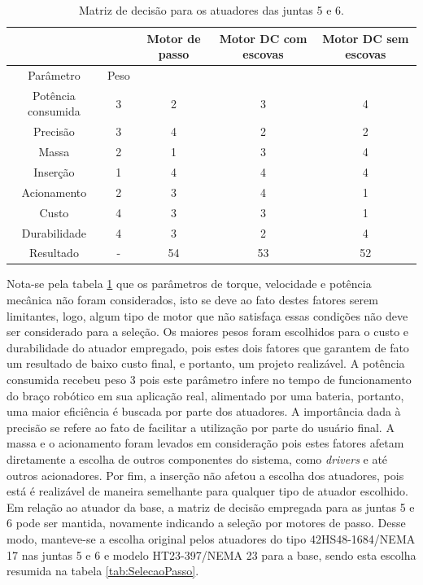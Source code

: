 \begin{table}[h]
\begin{centering}    
    
\begin{tabular}{|c|c|c|c|c|}
    \hline
     & & Motor de passo & Motor DC com escovas & Motor DC sem escovas \tabularnewline
    \hline
    Parâmetro & Peso & & & \tabularnewline 
    \hline
    \hline
    Potência consumida & 3 & 2 & 3 & 4 \tabularnewline
    \hline
    Precisão & 3 & 4 & 2 & 2 \tabularnewline
    \hline
    Massa & 2 & 1 & 3 & 4 \tabularnewline
    \hline
    Inserção & 1 & 4 & 4 & 4 \tabularnewline
    \hline    
    Acionamento & 2 & 3 & 4 & 1 \tabularnewline
    \hline
    Custo & 4 & 3 & 3 & 1 \tabularnewline
    \hline
    Durabilidade & 4 & 3 & 2 & 4 \tabularnewline
    \hline    
    \hline
    Resultado & - & 54 & 53 & 52 \tabularnewline
    \hline
\end{tabular}

\caption{Matriz de decisão para os atuadores das juntas 5 e 6.}
\label{tab:SelAtuadores56}

\par\end{centering}
\end{table}

Nota-se pela tabela \ref{tab:SelAtuadores56} que os parâmetros de torque, 
velocidade e potência mecânica não foram considerados, isto se deve ao 
fato destes fatores serem limitantes, logo, algum tipo de motor que não 
satisfaça essas condições não deve ser considerado para a seleção. 
Os maiores pesos foram escolhidos para o custo e durabilidade do atuador 
empregado, pois estes dois fatores que garantem de fato um resultado de 
baixo custo final, e portanto, um projeto realizável. A potência consumida 
recebeu peso 3 pois este parâmetro infere no tempo de funcionamento do 
braço robótico em sua aplicação real, alimentado por uma bateria, portanto, 
uma maior eficiência é buscada por parte dos atuadores. A importância dada 
à precisão se refere ao fato de facilitar a utilização por parte do usuário 
final. A massa e o acionamento foram levados em consideração pois estes 
fatores afetam diretamente a escolha de outros componentes do sistema, 
como \textit{drivers} e até outros acionadores. Por fim, a inserção não 
afetou a escolha dos atuadores, pois está é realizável de maneira semelhante 
para qualquer tipo de atuador escolhido. Em relação ao atuador da base, a 
matriz de decisão empregada para as juntas 5 e 6 pode ser mantida, 
novamente indicando a seleção por motores de passo. Desse modo, manteve-se 
a escolha original pelos atuadores do tipo 42HS48-1684/NEMA 17 nas juntas 
5 e 6 e modelo HT23-397/NEMA 23 para a base, sendo esta escolha resumida 
na tabela \ref{tab:SelecaoPasso}.

